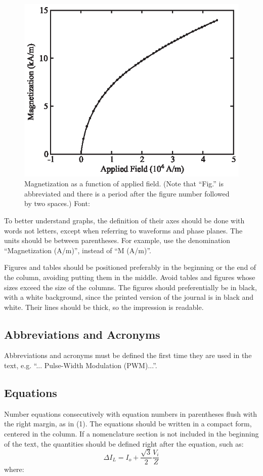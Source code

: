 \documentclass[english]{cobep-spec}
\begin{document}
\begin{figure}[!t]
	\includegraphics[scale=1]{Figs/figure.eps}
	\centering
	\caption{Magnetization as a function of applied field. (Note that ``Fig.'' is abbreviated and there is a period after the figure number followed by two spaces.) Font: \showfont}
	\label{fig:fig1}
\end{figure}

To better understand graphs, the definition of their axes should be done with words not letters, except when referring to waveforms and phase planes. The units should be between parentheses. For example, use the denomination ``Magnetization (A/m)'', instead of ``M (A/m)''.

Figures and tables should be positioned preferably in the beginning or the end of the column, avoiding putting them in the middle. Avoid tables and figures whose sizes exceed the size of the columns. The figures should preferentially be in black, with a white background, since the printed version of the journal is in black and white. Their lines should be thick, so the impression is readable.

\subsection{Abbreviations and Acronyms}
Abbreviations and acronyms must be defined the first time they are used in the text, e.g. ``... Pulse-Width Modulation (PWM)...''.

\subsection{Equations}
Number equations consecutively with equation numbers in parentheses flush with the right margin, as in (1). The equations should be written in a compact form, centered in the column. If a nomenclature section is not included in the beginning of the text, the quantities should be defined right after the equation, such as:
\begin{equation}
	\Delta I_{L}=I_{o}+\frac{\sqrt{3}}{2}\frac{V_{i}}{Z}
\end{equation} 
where: 
\end{document}
